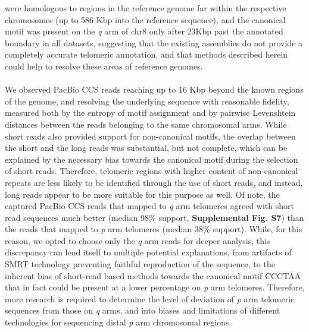 \documentclass{article}
\begin{document}
        were homologous to regions in the reference genome far within the respective chromosomes (up to 586 Kbp into the reference sequence),
        and the canonical motif was present on the \textit{q} arm of chr8
            only after 2\textendash{}3Kbp past the annotated boundary in all datasets,
        suggesting that the existing assemblies do not provide a completely accurate telomeric annotation,
        and that methods described herein could help to resolve these areas of reference genomes.
    \\~\\
    We observed PacBio CCS reads reaching up to 16 Kbp beyond the known regions of the genome,
        and resolving the underlying sequence with reasonable fidelity,
        measured both by the entropy of motif assignment and by pairwise Levenshtein distances
            between the reads belonging to the same chromosomal arms.
    While short reads also provided support for non-canonical motifs,
        the overlap between the short and the long reads was substantial, but not complete,
        which can be explained by the necessary bias towards the canonical motif during the selection of short reads.
    Therefore, telomeric regions with higher content of non-canonical repeats are less likely to be identified through the use of short reads,
        and instead, long reads appear to be more suitable for this purpose as well.
    Of note, the captured PacBio CCS reads that mapped to \textit{q} arm telomeres
        agreed with short read sequences much better (median 98\% support, \textbf{Supplemental Fig. S7})
        than the reads that mapped to \textit{p} arm telomeres (median 38\% support).
        While, for this reason, we opted to choose only the \textit{q} arm reads for deeper analysis,
            this discrepancy can lend itself to multiple potential explanations,
                from artifacts of SMRT technology preventing faithful reproduction of the sequence,
                to the inherent bias of short-read based methods \parencite{telomerecat} towards the canonical motif CCCTAA
                    that in fact could be present at a lower percentage on \textit{p} arm telomeres.
            Therefore, more research is required to determine the level of deviation of \textit{p} arm telomeric sequences
                from those on \textit{q} arms, and into biases and limitations of different technologies
                    for sequencing distal \textit{p} arm chromosomal regions.
    \\~\\
\end{document}
